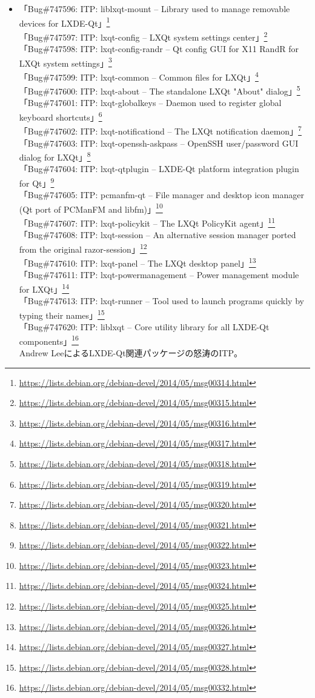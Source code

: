 \documentclass[mingoth,a4paper]{jsarticle}
\begin{document}
\begin{itemize}
\item 「Bug\#747596: ITP: liblxqt-mount -- Library used to manage removable devices for LXDE-Qt」\footnote{\url{https://lists.debian.org/debian-devel/2014/05/msg00314.html}}\\
  「Bug\#747597: ITP: lxqt-config -- LXQt system settings center」\footnote{\url{https://lists.debian.org/debian-devel/2014/05/msg00315.html}}\\
  「Bug\#747598: ITP: lxqt-config-randr -- Qt config GUI for X11 RandR for LXQt system settings」\footnote{\url{https://lists.debian.org/debian-devel/2014/05/msg00316.html}}\\
  「Bug\#747599: ITP: lxqt-common -- Common files for LXQt」\footnote{\url{https://lists.debian.org/debian-devel/2014/05/msg00317.html}}\\
  「Bug\#747600: ITP: lxqt-about -- The standalone LXQt "About" dialog」\footnote{\url{https://lists.debian.org/debian-devel/2014/05/msg00318.html}}\\
  「Bug\#747601: ITP: lxqt-globalkeys -- Daemon used to register global keyboard shortcuts」\footnote{\url{https://lists.debian.org/debian-devel/2014/05/msg00319.html}}\\
  「Bug\#747602: ITP: lxqt-notificationd -- The LXQt notification daemon」\footnote{\url{https://lists.debian.org/debian-devel/2014/05/msg00320.html}}\\
  「Bug\#747603: ITP: lxqt-openssh-askpass -- OpenSSH user/password GUI dialog for LXQt」\footnote{\url{https://lists.debian.org/debian-devel/2014/05/msg00321.html}}\\
  「Bug\#747604: ITP: lxqt-qtplugin -- LXDE-Qt platform integration plugin for Qt」\footnote{\url{https://lists.debian.org/debian-devel/2014/05/msg00322.html}}\\
  「Bug\#747605: ITP: pcmanfm-qt -- File manager and desktop icon manager (Qt port of PCManFM and libfm)」\footnote{\url{https://lists.debian.org/debian-devel/2014/05/msg00323.html}}\\
  「Bug\#747607: ITP: lxqt-policykit -- The LXQt PolicyKit agent」\footnote{\url{https://lists.debian.org/debian-devel/2014/05/msg00324.html}}\\
  「Bug\#747608: ITP: lxqt-session -- An alternative session manager ported from the original razor-session」\footnote{\url{https://lists.debian.org/debian-devel/2014/05/msg00325.html}}\\
  「Bug\#747610: ITP: lxqt-panel -- The LXQt desktop panel」\footnote{\url{https://lists.debian.org/debian-devel/2014/05/msg00326.html}}\\
  「Bug\#747611: ITP: lxqt-powermanagement -- Power management module for LXQt」\footnote{\url{https://lists.debian.org/debian-devel/2014/05/msg00327.html}}\\
  「Bug\#747613: ITP: lxqt-runner -- Tool used to launch programs quickly by typing their names」\footnote{\url{https://lists.debian.org/debian-devel/2014/05/msg00328.html}}\\
  「Bug\#747620: ITP: liblxqt -- Core utility library for all LXDE-Qt components」\footnote{\url{https://lists.debian.org/debian-devel/2014/05/msg00332.html}}\\
  Andrew LeeによるLXDE-Qt関連パッケージの怒涛のITP。


\end{itemize}
\end{document}

